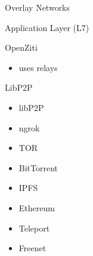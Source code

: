 \begin{block}{Overlay Networks}
\begin{block}{Application Layer (L7)}
\begin{block}{OpenZiti}

\begin{itemize}
\tightlist
\item
  uses relays
\end{itemize}
\end{block}

\begin{block}{LibP2P}
\label{thesis__022-overlays.md__libp2p}
\begin{itemize}
\tightlist
\item
  libP2P
\item
  ngrok
\item
  TOR
\item
  BitTorrent
\item
  IPFS
\item
  Ethereum
\item
  Teleport
\item
  Freenet
\end{itemize}
\end{block}
\end{block}
\end{block}


